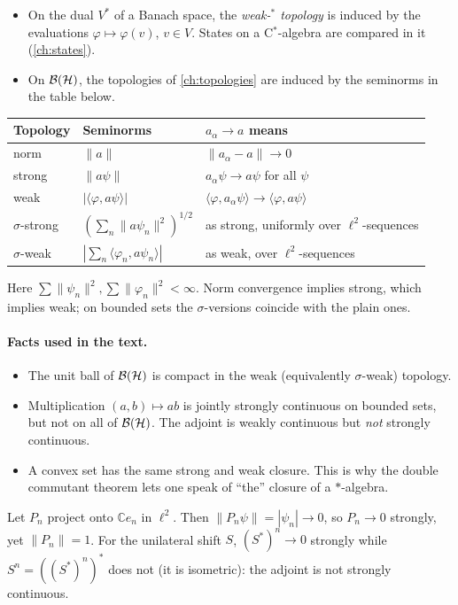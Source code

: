 \begin{itemize}
\item On the dual $V^*$ of a Banach space, the \emph{weak-$^*$ topology} is induced by the evaluations $\varphi\mapsto\varphi(v)$, $v\in V$. States on a C$^*$-algebra are compared in it (\cref{ch:states}).
\item On $\mathcal{B}(\mathcal{H})$, the topologies of \cref{ch:topologies} are induced by the seminorms in the table below.
\end{itemize}
\begin{center}\small
\begin{tabular}{@{}lll@{}}
\toprule
Topology & Seminorms & $a_\alpha\to a$ means\\
\midrule
norm & $\|a\|$ & $\|a_\alpha-a\|\to0$\\
strong & $\|a\psi\|$ & $a_\alpha\psi\to a\psi$ for all $\psi$\\
weak & $|\langle\varphi,a\psi\rangle|$ & $\langle\varphi,a_\alpha\psi\rangle\to\langle\varphi,a\psi\rangle$\\
$\sigma$-strong & $(\sum_n\|a\psi_n\|^2)^{1/2}$ & as strong, uniformly over $\ell^2$-sequences\\
$\sigma$-weak & $|\sum_n\langle\varphi_n,a\psi_n\rangle|$ & as weak, over $\ell^2$-sequences\\
\bottomrule
\end{tabular}
\end{center}
Here $\sum\|\psi_n\|^2,\sum\|\varphi_n\|^2<\infty$. Norm convergence implies strong, which implies weak; on bounded sets the $\sigma$-versions coincide with the plain ones.

\paragraph{Facts used in the text.}
\begin{itemize}
\item The unit ball of $\mathcal{B}(\mathcal{H})$ is compact in the weak (equivalently $\sigma$-weak) topology.
\item Multiplication $(a,b)\mapsto ab$ is jointly strongly continuous on bounded sets, but not on all of $\mathcal{B}(\mathcal{H})$. The adjoint is weakly continuous but \emph{not} strongly continuous.
\item A convex set has the same strong and weak closure. This is why the double commutant theorem lets one speak of ``the'' closure of a $*$-algebra.
\end{itemize}

\begin{example}
Let $P_n$ project onto $\mathbb C e_n$ in $\ell^2$. Then $\|P_n\psi\|=|\psi_n|\to0$, so $P_n\to0$ strongly, yet $\|P_n\|=1$. For the unilateral shift $S$, $(S^*)^n\to0$ strongly while $S^n=((S^*)^n)^*$ does not (it is isometric): the adjoint is not strongly continuous.
\end{example}

